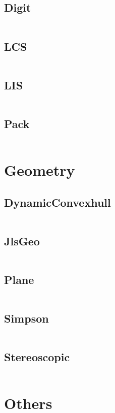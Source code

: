 \documentclass[a4paper,11pt]{article}
\begin{document}
\subsection{Digit}
\inputminted[breaklines]{c++}{05++DynamicProgramming/+Digit.cpp}
\subsection{LCS}
\inputminted[breaklines]{c++}{05++DynamicProgramming/+LCS.cpp}
\subsection{LIS}
\inputminted[breaklines]{c++}{05++DynamicProgramming/+LIS.cpp}
\subsection{Pack}
\inputminted[breaklines]{c++}{05++DynamicProgramming/+Pack.cpp}

\newpage
\section{Geometry}
\subsection{DynamicConvexhull}
\inputminted[breaklines]{c++}{06++Geometry/+DynamicConvexhull.cpp}
\subsection{JlsGeo}
\inputminted[breaklines]{c++}{06++Geometry/+JlsGeo.cpp}
\subsection{Plane}
\inputminted[breaklines]{c++}{06++Geometry/+Plane.cpp}
\subsection{Simpson}
\inputminted[breaklines]{c++}{06++Geometry/+Simpson.cpp}
\subsection{Stereoscopic}
\inputminted[breaklines]{c++}{06++Geometry/+Stereoscopic.cpp}

\newpage
\section{Others}
\end{document}
